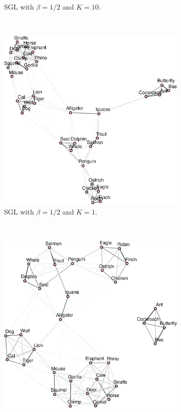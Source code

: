\begin{figure}[!htb]
\begin{subfigure}[b]{0.475\textwidth}
      \caption{\textsf{SGL} with $\beta = 1/2$ and $K = 10$.}
    \end{subfigure}\\
    \begin{subfigure}[b]{0.475\textwidth}
      \includegraphics[width=\textwidth]{animals/graphs_for_different_k/animals_graph_k1.eps}
      \caption{\textsf{SGL} with $\beta = 1/2$ and $K = 1$.}
    \end{subfigure}
    ~
    \begin{subfigure}[b]{0.475\textwidth}
      \includegraphics[width=\textwidth]{animals/graphs_for_different_k/animals_graph_k2.eps}

\end{subfigure}
\end{figure}
